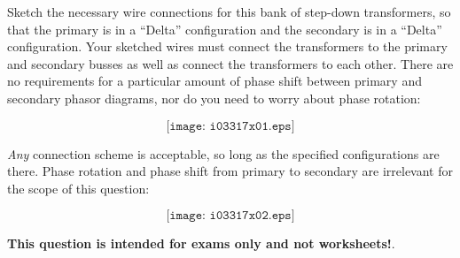 

Sketch the necessary wire connections for this bank of step-down transformers, so that the primary is in a ``Delta'' configuration and the secondary is in a ``Delta'' configuration.  Your sketched wires must connect the transformers to the primary and secondary busses as well as connect the transformers to each other.  There are no requirements for a particular amount of phase shift between primary and secondary phasor diagrams, nor do you need to worry about phase rotation:

$$\texttt{[image: i03317x01.eps]}$$







{\it Any} connection scheme is acceptable, so long as the specified configurations are there.  Phase rotation and phase shift from primary to secondary are irrelevant for the scope of this question:

$$\texttt{[image: i03317x02.eps]}$$







{\bf This question is intended for exams only and not worksheets!}.



